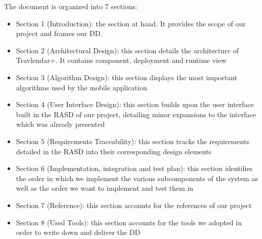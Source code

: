 The document is organized into 7 sections:

\begin{itemize}
	\item Section 1  (Introduction): the section at hand. It provides the scope of our project and frames our DD.
	\item Section 2 (Architectural Design): this section details the architecture of Travlendar+. It contains component, deployment and runtime view
	\item Section 3 (Algorithm Design): this section displays the most important algorithms used by the mobile application
	\item Section 4 (User Interface Design): this section  builds upon the user interface built in the RASD of our project, detailing minor expansions to the interface which was already presented
	\item Section 5 (Requirements Traceability): this section tracks the requirements detailed in the RASD into their corresponding design elements
	\item Section 6 (Implementation, integration and test plan): this section identifies the order in which we implement the various subcomponents of the system as well as the order we want to implement and test them in
	\item Section  7 (Reference): this section accounts for the references of our project
	\item Section 8 (Used Tools): this section accounts for the tools we adopted in order to write down and deliver the DD
\end{itemize}